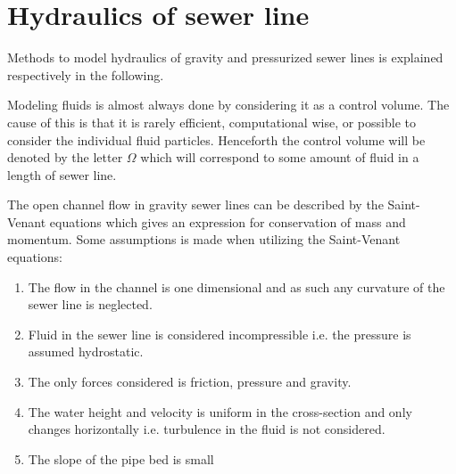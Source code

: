 \section{Hydraulics of sewer line}\label{se:hydraulics_of_sewer_line}

Methods to model hydraulics of gravity and pressurized sewer lines is explained respectively in the following. 

Modeling fluids is almost always done by considering it as a control volume. The cause of this is that it is rarely efficient, computational wise, or possible to consider the individual fluid particles.
Henceforth the control volume will be denoted by the letter $\Omega$ which will correspond to some amount of fluid in a length of sewer line.

The open channel flow in gravity sewer lines can be described by the Saint-Venant equations which gives an expression for conservation of mass and momentum.
Some assumptions is made when utilizing the Saint-Venant equations:

\begin{table}[H]
\begin{enumerate}
\item The flow in the channel is one dimensional and as such any curvature of the sewer line is neglected.
\item Fluid in the sewer line is considered incompressible i.e. the pressure is assumed hydrostatic.
\item The only forces considered is friction, pressure and gravity.
\item The water height and velocity is uniform in the cross-section and only changes horizontally i.e. turbulence in the fluid is not considered.
\item The slope of the pipe bed is small
\end{enumerate}
\label{tab:saintbernard_assumptions}
\end{table}

